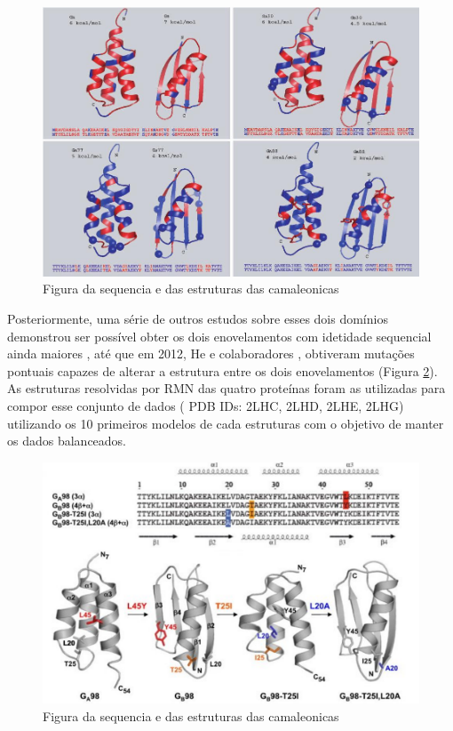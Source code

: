 \begin{figure}
  \centering
  \includegraphics[width=1.0\textwidth]{figures/ga_gb.jpg}
  \caption{Figura da sequencia e das estruturas das camaleonicas}
        \label{fig:ga_gb}
\end{figure}

Posteriormente, uma série de outros estudos sobre esses dois domínios demonstrou ser possível obter os dois enovelamentos com idetidade sequencial ainda maiores \cite{10.1073/pnas.0805857105, 10.1073/pnas.0906408106},  até que em 2012, He e colaboradores \cite{10.1016/j.str.2011.11.018}, obtiveram mutações pontuais capazes de alterar a estrutura entre os dois enovelamentos (Figura \ref{fig:camaleonicas}). As estruturas resolvidas por RMN das quatro proteínas foram as utilizadas para compor esse conjunto de dados ( PDB IDs: 2LHC, 2LHD, 2LHE, 2LHG) utilizando os 10 primeiros modelos de cada estruturas com o objetivo de manter os dados balanceados.

\begin{figure}
  \centering
  \includegraphics[width=1.0\textwidth]{figures/chameleonic_resume.pdf}
  \caption{Figura da sequencia e das estruturas das camaleonicas}
        \label{fig:camaleonicas}
\end{figure}
